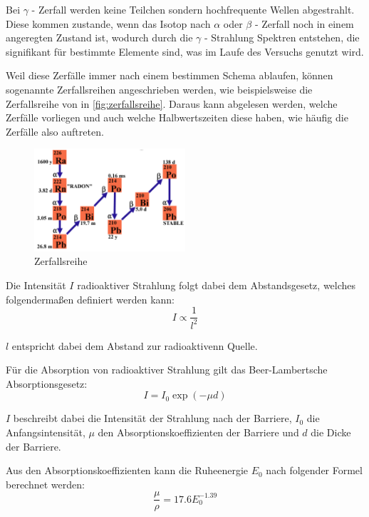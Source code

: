 \documentclass[12pt,english,ngerman]{scrartcl}
\begin{document}
Bei $\gamma$ - Zerfall werden keine Teilchen sondern hochfrequente Wellen abgestrahlt. Diese kommen zustande,
wenn das Isotop nach $\alpha$ oder $\beta$ - Zerfall noch in einem angeregten Zustand ist, wodurch durch die
$\gamma$ - Strahlung Spektren entstehen, die signifikant für bestimmte Elemente sind, was im Laufe des Versuchs 
genutzt wird.


Weil diese Zerfälle immer nach einem bestimmen Schema ablaufen, können sogenannte Zerfallsreihen angeschrieben werden, 
wie beispielsweise die Zerfallsreihe von  in \autoref{fig:zerfallsreihe}. Daraus kann abgelesen
werden, welche Zerfälle vorliegen und auch welche Halbwertszeiten diese haben, wie häufig die Zerfälle also auftreten.

\begin{figure}[H]
  \begin{center}
  \includegraphics[width=0.5\textwidth]{./figures/zerfallsreihe.png}
	\end{center}
	\caption{Zerfallsreihe  \cite[]{}}
	\label{fig:zerfallsreihe}
    
\end{figure}


Die Intensität $I$ radioaktiver Strahlung folgt dabei dem Abstandsgesetz, welches folgendermaßen definiert werden kann:
\begin{equation}
  I \propto \frac{1}{l^2}
\end{equation}

$l$ entspricht dabei dem Abstand zur radioaktivenn Quelle.

Für die Absorption von radioaktiver Strahlung gilt das Beer-Lambertsche Absorptionsgesetz:
\begin{equation}
  I = I_0 \exp(-\mu d)
\end{equation}

$I$ beschreibt dabei die Intensität der Strahlung nach der Barriere, $I_0$ die Anfangsintensität, 
$\mu$ den Absorptionskoeffizienten der Barriere und $d$ die Dicke der Barriere.

Aus den Absorptionskoeffizienten kann die Ruheenergie $E_0$ nach folgender Formel berechnet werden:
\begin{equation}
  \frac{\mu}{\rho} = 17.6 E_0^{-1.39}
\end{equation}
\end{document}

